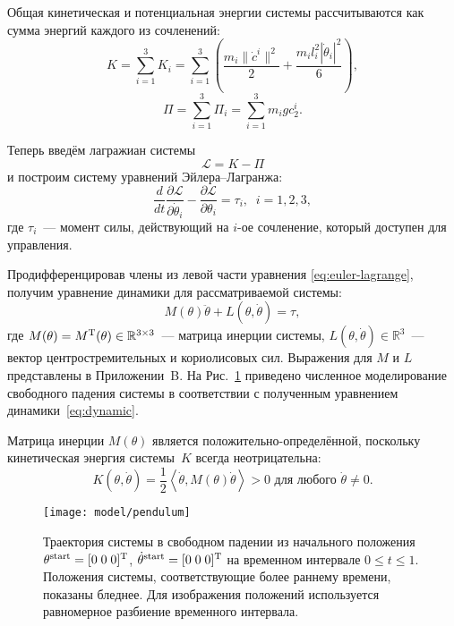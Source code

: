 \documentclass[../../doc.tex]{subfiles}
\begin{document}
    Общая кинетическая и потенциальная энергии системы рассчитываются как сумма энергий каждого из сочленений:
    $$
        K = \sum_{i=1}^{3} K_i = \sum_{i=1}^{3}\left( \frac{m_i \|\dot c^i\|^2}{2} + \frac{m_i l_i^2 |\dot \theta_i|^2}{6} \right),
    $$
    $$
        \Pi = \sum_{i=1}^{3} \Pi_i = \sum_{i=1}^{3} m_i g c^i_2.
    $$

    Теперь введём лагражиан системы
    $$
        \mathcal{L} = K - \Pi
    $$
    и построим систему уравнений Эйлера--Лагранжа:
    \begin{equation}\label{eq:euler-lagrange}
        \frac{d}{dt} \frac{\partial \mathcal{L}}{\partial \dot \theta_i} - \frac{\partial \mathcal{L}}{\partial \theta_i} = \tau_i,\;\; i = 1,2,3,
    \end{equation}
    где $\tau_i$~--- момент силы, действующий на $i$-ое сочленение, который доступен для управления.

    Продифференцировав члены из левой части уравнения \eqref{eq:euler-lagrange}, получим уравнение динамики для рассматриваемой системы:
    \begin{equation}\label{eq:dynamic}
        M(\theta)\ddot\theta + L(\theta, \dot\theta) = \tau,
    \end{equation}
    где $M(\theta) = M ^\textnormal{T} (\theta) \in \mathbb{R}^{3 \times 3}$~--- матрица инерции системы, $L(\theta, \dot\theta)\in\mathbb{R}^{3}$~--- вектор центростремительных и кориолисовых сил.
    Выражения для $M$ и $L$ представлены в Приложении~B.
    На Рис.~\ref{img:pendulum} приведено численное моделирование свободного падения системы в соответствии с полученным уравнением динамики~\eqref{eq:dynamic}.

    \begin{remark}
        Матрица инерции $M(\theta)$ является положительно-опре\-де\-лён\-ной, поскольку кинетическая энергия системы~$K$ всегда неотрицательна:
        \begin{equation*}
            K(\theta, \dot\theta) = \frac{1}{2}\left\langle \dot \theta, M(\theta) \dot \theta \right\rangle > 0 \mbox{ для любого } \dot \theta \neq 0.
        \end{equation*}
    \end{remark}

    \begin{figure}[h]
        \begin{center}
            \texttt{[image: model/pendulum]}
        \end{center}
        \caption{
            Траектория системы в свободном падении из начального положения $\theta^{\textnormal{start}} = [0\; 0\; 0]^\textnormal{T}$, $\dot\theta^{\textnormal{start}} = [0\;0\;0]^\textnormal{T}$ на временном интервале $0 \leqslant t \leqslant 1$.
            Положения системы, соответствующие более раннему времени, показаны бледнее.
            Для изображения положений используется равномерное разбиение временного интервала.
        }
        \label{img:pendulum}
    \end{figure}

    \ifSubfilesClassLoaded{
        \nocite{*}
        \clearpage
        
        
    }{}
\end{document}
